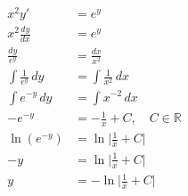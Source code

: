 		\begin{align*}
			x^2 y' &= e^y \\
			x^2 \frac{dy}{dx} &= e^y \\
			\frac{dy}{e^y} &= \frac{dx}{x^2} \\
			\int \frac{1}{e^{y}} \, dy &= \int \frac{1}{x^{2}} \, dx \\
			\int e^{-y}\,dy &= \int x^{-2} \, dx \\
			-e^{-y} &= -\frac{1}{x} + C, \quad C \in \mathbb{R} \\
			\ln(e^{-y}) &= \ln \lvert \frac{1}{x} + C \rvert \\
			-y &= \ln \lvert \frac{1}{x} + C \rvert \\
			y &= -\ln \lvert \frac{1}{x} + C \rvert
		\end{align*}
